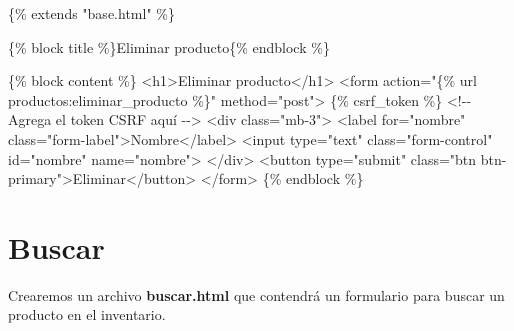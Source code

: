 \documentclass[
  a4paper,
  DIV=11,
  numbers=noendperiod,
  onepage,
  openany]{scrreprt}
\newenvironment{Shaded}{\begin{snugshade}}{\end{snugshade}}
\newcommand{\CommentTok}[1]{\textcolor[rgb]{0.37,0.37,0.37}{#1}}
\newcommand{\DataTypeTok}[1]{\textcolor[rgb]{0.68,0.00,0.00}{#1}}
\newcommand{\KeywordTok}[1]{\textcolor[rgb]{0.00,0.23,0.31}{#1}}
\newcommand{\NormalTok}[1]{\textcolor[rgb]{0.00,0.23,0.31}{#1}}
\newcommand{\OperatorTok}[1]{\textcolor[rgb]{0.37,0.37,0.37}{#1}}
\newcommand{\OtherTok}[1]{\textcolor[rgb]{0.00,0.23,0.31}{#1}}
\newcommand{\StringTok}[1]{\textcolor[rgb]{0.13,0.47,0.30}{#1}}
\begin{document}
\begin{Shaded}
\begin{Highlighting}[]
\NormalTok{\{\% extends "base.html" \%\}}

\NormalTok{\{\% block title \%\}Eliminar producto\{\% endblock \%\}}

\NormalTok{\{\% block content \%\}}
\DataTypeTok{\textless{}}\KeywordTok{h1}\DataTypeTok{\textgreater{}}\NormalTok{Eliminar producto}\DataTypeTok{\textless{}/}\KeywordTok{h1}\DataTypeTok{\textgreater{}}
\DataTypeTok{\textless{}}\KeywordTok{form}\OtherTok{ action}\OperatorTok{=}\StringTok{"\{\% url \textquotesingle{}productos:eliminar\_producto\textquotesingle{} \%\}"}\OtherTok{ method}\OperatorTok{=}\StringTok{"post"}\DataTypeTok{\textgreater{}}
\NormalTok{    \{\% csrf\_token \%\}  }\CommentTok{\textless{}!{-}{-} Agrega el token CSRF aquí {-}{-}\textgreater{}}
    \DataTypeTok{\textless{}}\KeywordTok{div}\OtherTok{ class}\OperatorTok{=}\StringTok{"mb{-}3"}\DataTypeTok{\textgreater{}}
        \DataTypeTok{\textless{}}\KeywordTok{label}\OtherTok{ for}\OperatorTok{=}\StringTok{"nombre"}\OtherTok{ class}\OperatorTok{=}\StringTok{"form{-}label"}\DataTypeTok{\textgreater{}}\NormalTok{Nombre}\DataTypeTok{\textless{}/}\KeywordTok{label}\DataTypeTok{\textgreater{}}
        \DataTypeTok{\textless{}}\KeywordTok{input}\OtherTok{ type}\OperatorTok{=}\StringTok{"text"}\OtherTok{ class}\OperatorTok{=}\StringTok{"form{-}control"}\OtherTok{ id}\OperatorTok{=}\StringTok{"nombre"}\OtherTok{ name}\OperatorTok{=}\StringTok{"nombre"}\DataTypeTok{\textgreater{}}
    \DataTypeTok{\textless{}/}\KeywordTok{div}\DataTypeTok{\textgreater{}}
    \DataTypeTok{\textless{}}\KeywordTok{button}\OtherTok{ type}\OperatorTok{=}\StringTok{"submit"}\OtherTok{ class}\OperatorTok{=}\StringTok{"btn btn{-}primary"}\DataTypeTok{\textgreater{}}\NormalTok{Eliminar}\DataTypeTok{\textless{}/}\KeywordTok{button}\DataTypeTok{\textgreater{}}
\DataTypeTok{\textless{}/}\KeywordTok{form}\DataTypeTok{\textgreater{}}
\NormalTok{\{\% endblock \%\}}
\end{Highlighting}
\end{Shaded}

\section{Buscar}\label{buscar}

Crearemos un archivo \textbf{buscar.html} que contendrá un formulario
para buscar un producto en el inventario.
\end{document}

